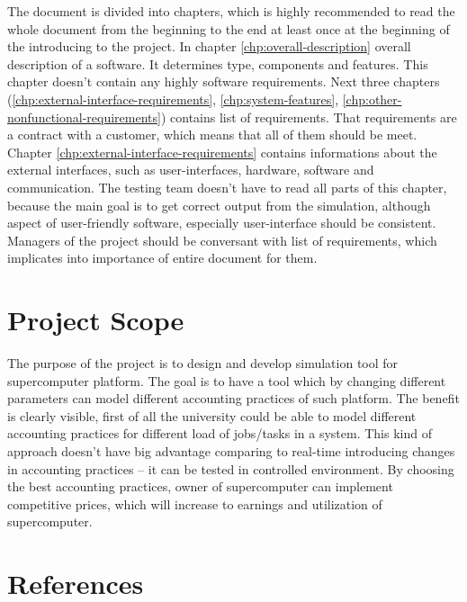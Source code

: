 	The document is divided into chapters, which is highly recommended to read the whole document from the beginning to the end at least once at the beginning of the introducing to the project. In chapter \ref{chp:overall-description} overall description of a software. It determines type, components and features. This chapter doesn't contain any highly software requirements. Next three chapters (\ref{chp:external-interface-requirements}, \ref{chp:system-features}, \ref{chp:other-nonfunctional-requirements}) contains list of requirements. That requirements are a contract with a customer, which means that all of them should be meet. Chapter \ref{chp:external-interface-requirements} contains informations about the external interfaces, such as user-interfaces, hardware, software and communication. The testing team doesn't have to read all parts of this chapter, because the main goal is to get correct output from the simulation, although aspect of user-friendly software, especially user-interface should be consistent. Managers of the project should be conversant with list of requirements, which implicates into importance of entire document for them. 
\section{Project Scope}
	\begin{comment}
		$<$Provide a short description of the software being specified and its purpose, 
		including relevant benefits, objectives, and goals. Relate the software to 
		corporate goals or business strategies. If a separate vision and scope document 
		is available, refer to it rather than duplicating its contents here.$>$
	\end{comment}
	The purpose of the project is to design and develop simulation tool for supercomputer platform. The goal is to have a tool which by changing different parameters can model different accounting practices of such platform. The benefit is clearly visible, first of all the university could be able to model different accounting practices for different load of jobs/tasks in a system. This kind of approach doesn't have big advantage comparing to real-time introducing changes in accounting practices -- it can be tested in controlled environment. By choosing the best accounting practices, owner of supercomputer can implement competitive prices, which will increase to earnings and utilization of supercomputer.

\section{References}
	\begin{comment}
		$<$List any other documents or Web addresses to which this SRS refers. These may 
		include user interface style guides, contracts, standards, system requirements 
		specifications, use case documents, or a vision and scope document. Provide 
		enough information so that the reader could access a copy of each reference, 
		including title, author, version number, date, and source or location.$>$
	\end{comment}
